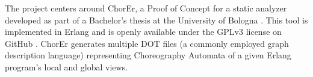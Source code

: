 The project centers around ChorEr, a Proof of Concept for a static analyzer developed as part of a Bachelor's thesis at the University of Bologna \cite{genovese2023chorer}. This tool is implemented in Erlang and is openly available under the GPLv3 license on GitHub \cite{website:chorer}. ChorEr generates multiple DOT files (a commonly employed graph description language) representing Choreography Automata of a given Erlang program's local and global views.
